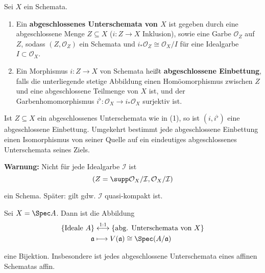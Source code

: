 \begin{defn}[35]
  Sei $X$ ein Schemata.
  \begin{enumerate}
  \item Ein \textbf{abgeschlossenes Unterschemata von $X$ }ist gegeben durch
    eine abgeschlossene Menge $Z\subseteq X$ ($i:Z\rightarrow X$ Inklusion),
    sowie eine Garbe $\mathcal{O}_{Z}$ auf $Z$, sodass $(Z,\mathcal{O}_{Z})$
    ein Schemata und $i_{\ast}\mathcal{O}_{Z}\cong\mathcal{O}_{X}/I$
    für eine Idealgarbe $I\subset\mathcal{O}_{X}$.
  \item Ein Morphismus $i:Z\rightarrow X$ von Schemata heißt \textbf{abgeschlossene
      Einbettung}, falls die unterliegende stetige Abbildung einen Homöomorphismus
    zwischen $Z$ und eine abgeschlossene Teilmenge von $X$ ist, und
    der Garbenhomomorphismus $i^{\flat}:\mathcal{O}_{X}\rightarrow i_{\ast}\mathcal{O}_{X}$
    surjektiv ist.
  \end{enumerate}
  Ist $Z\subseteq X$ ein abgeschlossenes Unterschemata wie in (1),
  so ist $(i,i^{\flat})$ eine abgeschlossene Einbettung. Umgekehrt
  bestimmt jede abgeschlossene Einbettung einen Isomorphismus von seiner
  Quelle auf ein eindeutiges abgeschlossenes Unterschemata seines Ziels.

  \textbf{Warnung:} Nicht für jede Idealgarbe $\mathcal{I}$ ist
  \[
    (Z=\supp\mathcal{O}_{X}/\mathcal{I},\mathcal{O}_{X}/\mathcal{I})
  \]

  ein Schema. Später: gilt gdw. $\mathcal{I}$ quasi-kompakt ist.
\end{defn}

\begin{thm}[36]
  Sei $X=\Spec A$. Dann ist die Abbildung
  \begin{align*}
    \text{\{Ideale }A\} & \overset{1:1}{\longleftrightarrow}\{\text{abg. Unterschemata von }X\}\\
    \mathfrak{a} & \longmapsto V(\mathfrak{a})\cong\Spec(A/\mathfrak{a})
  \end{align*}

  eine Bijektion. Insbesondere ist jedes abgeschlossene Unterschemata
  eines affinen Schematas affin.
\end{thm}

